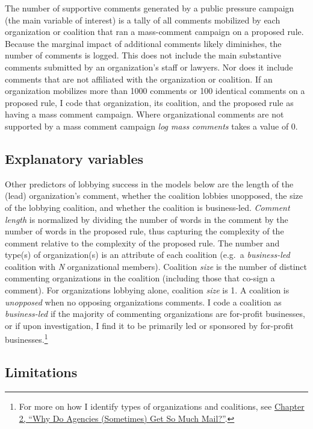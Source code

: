 \documentclass[
      12pt,
        ]{article}
\begin{document}
The number of supportive comments generated by a public pressure campaign (the main variable of interest) is a tally of all comments mobilized by each organization or coalition that ran a mass-comment campaign on a proposed rule. Because the marginal impact of additional comments likely diminishes, the number of comments is logged. This does not include the main substantive comments submitted by an organization's staff or lawyers. Nor does it include comments that are not affiliated with the organization or coalition. If an organization mobilizes more than 1000 comments or 100 identical comments on a proposed rule, I code that organization, its coalition, and the proposed rule as having a mass comment campaign. Where organizational comments are not supported by a mass comment campaign \emph{log mass comments} takes a value of 0.

\hypertarget{explanatory-variables}{%
\subsection{Explanatory variables}\label{explanatory-variables}}

Other predictors of lobbying success in the models below are the length of the (lead) organization's comment, whether the coalition lobbies unopposed, the size of the lobbying coalition, and whether the coalition is business-led. \emph{Comment length} is normalized by dividing the number of words in the comment by the number of words in the proposed rule, thus capturing the complexity of the comment relative to the complexity of the proposed rule. The number and type(s) of organization(s) is an attribute of each coalition (e.g.~a \emph{business-led} coalition with \emph{N} organizational members). Coalition \emph{size} is the number of distinct commenting organizations in the coalition (including those that co-sign a comment). For organizations lobbying alone, coalition \emph{size} is 1. A coalition is \emph{unopposed} when no opposing organizations comments. I code a coalition as \emph{business-led} if the majority of commenting organizations are for-profit businesses, or if upon investigation, I find it to be primarily led or sponsored by for-profit businesses.\footnote{For more on how I identify types of organizations and coalitions, see \href{https://judgelord.github.io/dissertation/whyMail.pdf}{Chapter 2, ``Why Do Agencies (Sometimes) Get So Much Mail?''}.}

\hypertarget{limitations}{%
\subsection{Limitations}\label{limitations}}
\end{document}

